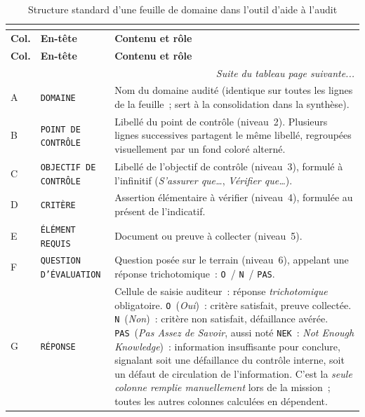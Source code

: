 \begin{longtable}{|p{1.2cm}|p{3cm}|p{11cm}|}
\caption{Structure standard d'une feuille de domaine dans l'outil d'aide à
l'audit} \\
\label{tab:colonnes-excel} \\
\hline
\rowcolor{gray!20}
\textbf{Col.} & \textbf{En-tête} & \textbf{Contenu et rôle} \\ \hline
\endfirsthead

\hline
\rowcolor{gray!20}
\textbf{Col.} & \textbf{En-tête} & \textbf{Contenu et rôle} \\ \hline
\endhead

\hline
\multicolumn{3}{r}{\footnotesize \textit{Suite du tableau page suivante...}} \\
\endfoot

\hline
\endlastfoot

A & \texttt{DOMAINE} &
  Nom du domaine audité (identique sur toutes les lignes de la feuille~;
  sert à la consolidation dans la synthèse). \\ \hline

B & \texttt{POINT DE CONTRÔLE} &
  Libellé du point de contrôle (niveau~2). Plusieurs lignes successives
  partagent le même libellé, regroupées visuellement par un fond coloré
  alterné. \\ \hline

C & \texttt{OBJECTIF DE CONTRÔLE} &
  Libellé de l'objectif de contrôle (niveau~3), formulé à l'infinitif
  (\emph{S'assurer que\ldots}, \emph{Vérifier que\ldots}). \\ \hline

D & \texttt{CRITÈRE} &
  Assertion élémentaire à vérifier (niveau~4), formulée au présent de
  l'indicatif. \\ \hline

E & \texttt{ÉLÉMENT REQUIS} &
  Document ou preuve à collecter (niveau~5). \\ \hline

F & \texttt{QUESTION D'ÉVALUATION} &
  Question posée sur le terrain (niveau~6), appelant une réponse
  trichotomique~: \texttt{O}~/ \texttt{N}~/ \texttt{PAS}. \\ \hline

G & \texttt{RÉPONSE} &
  Cellule de saisie auditeur~: réponse \emph{trichotomique} obligatoire.
  \texttt{O}~(\emph{Oui})~: critère satisfait, preuve collectée.
  \texttt{N}~(\emph{Non})~: critère non satisfait, défaillance avérée.
  \texttt{PAS}~(\emph{Pas Assez de Savoir}, aussi noté \texttt{NEK}~: 
  \emph{Not Enough Knowledge})~: information insuffisante pour conclure,
  signalant soit une défaillance du contrôle interne, soit un défaut de
  circulation de l'information.
  C'est la \emph{seule colonne remplie manuellement} lors de la mission~;
  toutes les autres colonnes calculées en dépendent. \\ \hline


\end{longtable}
